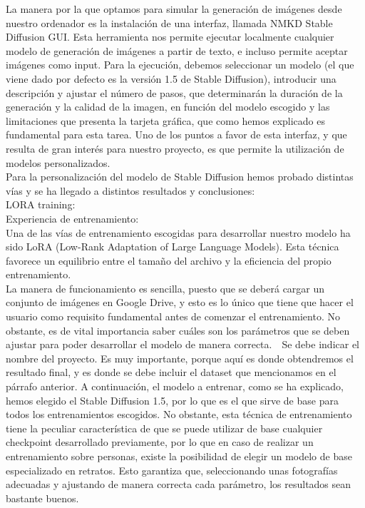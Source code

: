 La manera por la que optamos para simular la generación de imágenes desde nuestro ordenador es la instalación de una interfaz, llamada NMKD Stable Diffusion GUI. Esta herramienta nos permite ejecutar localmente cualquier modelo de generación de imágenes a partir de texto, e incluso permite aceptar imágenes como input. Para la ejecución, debemos seleccionar un modelo (el que viene dado por defecto es la versión 1.5 de Stable Diffusion), introducir una descripción y ajustar el número de pasos, que determinarán la duración de la generación y la calidad de la imagen, en función del modelo escogido y las limitaciones que presenta la tarjeta gráfica, que como hemos explicado es fundamental para esta tarea. Uno de los puntos a favor de esta interfaz, y que resulta de gran interés para nuestro proyecto, es que permite la utilización de modelos personalizados. \\

Para la personalización del modelo de Stable Diffusion hemos probado distintas vías y se ha llegado a distintos resultados y conclusiones:\\

LORA training: \\

Experiencia de entrenamiento:\\

Una de las vías de entrenamiento escogidas para desarrollar nuestro modelo ha sido LoRA (Low-Rank Adaptation of Large Language Models). Esta técnica favorece un equilibrio entre el tamaño del archivo y la eficiencia del propio entrenamiento.\\

La manera de funcionamiento es sencilla, puesto que se deberá cargar un conjunto de imágenes en Google Drive, y esto es lo único que tiene que hacer el usuario como requisito fundamental antes de comenzar el entrenamiento. No obstante, es de vital importancia saber cuáles son los parámetros que se deben ajustar para poder desarrollar el modelo de manera correcta.\
\
Se debe indicar el nombre del proyecto. Es muy importante, porque  aquí es donde obtendremos el resultado final, y es donde se debe incluir el dataset que mencionamos en el párrafo anterior. A continuación, el modelo a entrenar, como se ha explicado, hemos elegido el Stable Diffusion 1.5, por lo que es el que sirve de base para todos los entrenamientos escogidos. No obstante, esta técnica de entrenamiento tiene la peculiar característica de que se puede utilizar de base cualquier checkpoint desarrollado previamente, por lo que en caso de realizar un entrenamiento sobre personas, existe la posibilidad de elegir un modelo de base especializado en retratos. Esto garantiza que, seleccionando unas fotografías adecuadas y ajustando de manera correcta cada parámetro, los resultados sean bastante buenos.\\


